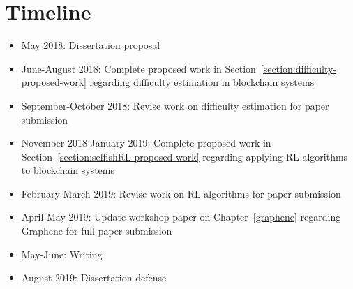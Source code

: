 \chapter{Timeline}
\label{timeline}

\begin{itemize}
\item May 2018: Dissertation proposal
\item June-August 2018: Complete proposed work in Section~\ref{section:difficulty-proposed-work} regarding difficulty estimation in blockchain systems
\item September-October 2018: Revise work on difficulty estimation for paper submission
\item November 2018-January 2019:  Complete proposed work in Section~\ref{section:selfishRL-proposed-work} regarding applying RL algorithms to blockchain systems
\item February-March 2019: Revise work on RL algorithms for paper submission
\item April-May 2019: Update workshop paper on Chapter~\ref{graphene} regarding Graphene for full paper submission
\item May-June: Writing 
\item August 2019: Dissertation defense
\end{itemize}